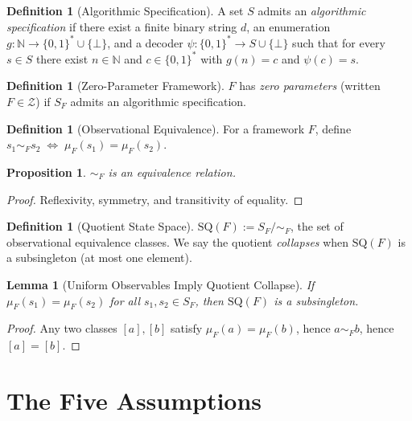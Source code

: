 \documentclass[11pt]{article}
\newcommand{\N}{\mathbb{N}}
\newcommand{\SQ}{\mathrm{SQ}}
\newcommand{\cZ}{\mathcal{Z}}
\newtheorem{lemma}[theorem]{Lemma}
\newtheorem{proposition}[theorem]{Proposition}
\theoremstyle{definition}
\newtheorem{definition}[theorem]{Definition}
\theoremstyle{remark}
\begin{document}
\begin{definition}[Algorithmic Specification]\label{def:alg-spec}
A set $S$ admits an \emph{algorithmic specification} if there exist
a finite binary string $d$,
an enumeration $g : \N \to \{0,1\}^* \cup \{\bot\}$,
and a decoder $\psi : \{0,1\}^* \to S \cup \{\bot\}$
such that for every $s \in S$ there exist $n \in \N$ and
$c \in \{0,1\}^*$ with $g(n) = c$ and $\psi(c) = s$.
\end{definition}

\begin{definition}[Zero-Parameter Framework]\label{def:zero-param}
$F$ has \emph{zero parameters} (written $F \in \cZ$) if
$S_F$ admits an algorithmic specification.
\end{definition}

\begin{definition}[Observational Equivalence]\label{def:obs-equiv}
For a framework $F$, define
$s_1 \sim_F s_2 \;\Longleftrightarrow\; \mu_F(s_1) = \mu_F(s_2)$.
\end{definition}

\begin{proposition}\label{prop:equiv-rel}
$\sim_F$ is an equivalence relation.
\end{proposition}
\begin{proof}
Reflexivity, symmetry, and transitivity of equality.
\end{proof}

\begin{definition}[Quotient State Space]\label{def:quotient}
$\SQ(F) := S_F / {\sim_F}$, the set of observational equivalence
classes.
We say the quotient \emph{collapses} when $\SQ(F)$ is a subsingleton
(at most one element).
\end{definition}

\begin{lemma}[Uniform Observables Imply Quotient Collapse]
\label{lem:uniform-collapse}
If $\mu_F(s_1) = \mu_F(s_2)$ for all $s_1, s_2 \in S_F$,
then $\SQ(F)$ is a subsingleton.
\end{lemma}
\begin{proof}
Any two classes $[a], [b]$ satisfy $\mu_F(a) = \mu_F(b)$,
hence $a \sim_F b$, hence $[a] = [b]$.
\end{proof}

\section{The Five Assumptions}\label{sec:assumptions}
\end{document}
